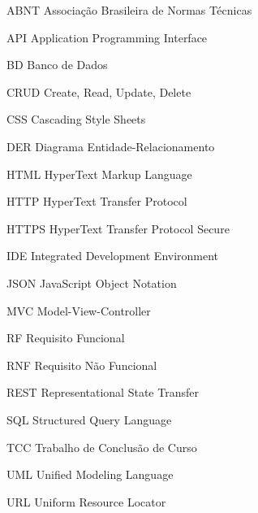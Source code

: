 %
%
\begin{siglas}
  \item[ABNT]   Associação Brasileira de Normas Técnicas
  \item[API]    Application Programming Interface
  \item[BD]     Banco de Dados
  \item[CRUD]   Create, Read, Update, Delete
  \item[CSS]    Cascading Style Sheets
  \item[DER]    Diagrama Entidade-Relacionamento
  \item[HTML]   HyperText Markup Language
  \item[HTTP]   HyperText Transfer Protocol
  \item[HTTPS]  HyperText Transfer Protocol Secure
  \item[IDE]    Integrated Development Environment
  \item[JSON]   JavaScript Object Notation
  \item[MVC]    Model-View-Controller
  \item[RF]     Requisito Funcional
  \item[RNF]    Requisito Não Funcional
  \item[REST]   Representational State Transfer
  \item[SQL]    Structured Query Language
  \item[TCC]    Trabalho de Conclusão de Curso
  \item[UML]    Unified Modeling Language
  \item[URL]    Uniform Resource Locator
\end{siglas}
